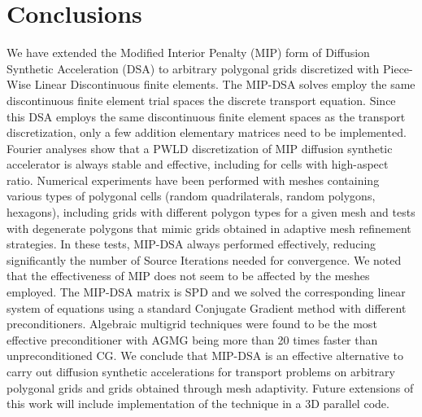 \section{Conclusions} \label{sec_conc}
We have extended the Modified Interior Penalty (MIP) form of Diffusion Synthetic Acceleration (DSA) 
to arbitrary polygonal grids discretized with Piece-Wise Linear Discontinuous finite elements. 
The MIP-DSA solves employ the same discontinuous finite element trial spaces  
the discrete \sn transport equation.
Since this DSA employs the same discontinuous finite element spaces as the \sn transport discretization,
only a few addition elementary matrices need to be implemented. 
%
%
%
Fourier analyses show that a PWLD discretization of MIP diffusion synthetic accelerator 
is always stable and effective, including for cells with high-aspect ratio. 
%
Numerical experiments have been performed with meshes containing various types of polygonal cells
(random quadrilaterals, random polygons, hexagons), including
grids with different polygon types for a given mesh and tests with degenerate polygons that mimic
grids obtained in adaptive mesh refinement strategies. In these tests, MIP-DSA always performed effectively,
reducing significantly the number of Source Iterations needed for convergence. 
We noted that the effectiveness of MIP does not seem to be affected by the meshes employed. 
%
The MIP-DSA  matrix is SPD and we solved the corresponding linear system of equations using a standard Conjugate
Gradient method with different preconditioners. 
Algebraic multigrid techniques were found to be the most effective preconditioner with AGMG being more than 20 times
faster than unpreconditioned CG.
We conclude that MIP-DSA is an effective  alternative to
carry out diffusion synthetic accelerations for \sn transport problems on arbitrary polygonal grids and 
grids obtained through mesh adaptivity.
Future extensions of this work will include implementation of the technique in a 3D parallel \sn code.



